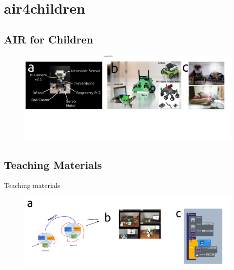 \section{air4children}

\subsection{AIR for Children}

{
\begin{frame}{}
      \begin{figure}
        \centering
        \includegraphics[width=1.0\textwidth]{./figures/air4children/versions/drawing-v02.png}
      \end{figure}
\end{frame}
}

\subsection{Teaching Materials}

{
\begin{frame}{Teaching materials}
      \begin{figure}
        \centering
        \includegraphics[width=1.0\textwidth]{./figures/teaching-materials/versions/drawing-v01.png}
      \end{figure}
\end{frame}
}
